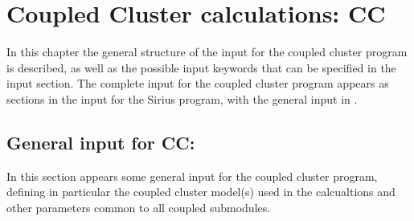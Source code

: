 \chapter{Coupled Cluster calculations: CC}
\label{chap:ccgeneral}

In this chapter the general structure of the input for the 
coupled cluster program is described, as well as the possible 
input keywords that can be specified in the  
input section. 
The complete input for the coupled cluster program appears as
sections in the input for the Sirius program, with the general
input in . 

\section{General input for CC: }\label{sec:ccgeneral}

In this section appears some general input for the coupled
cluster program, defining in particular the coupled cluster 
model(s) used in the calcualtions and other parameters common 
to all coupled submodules.

